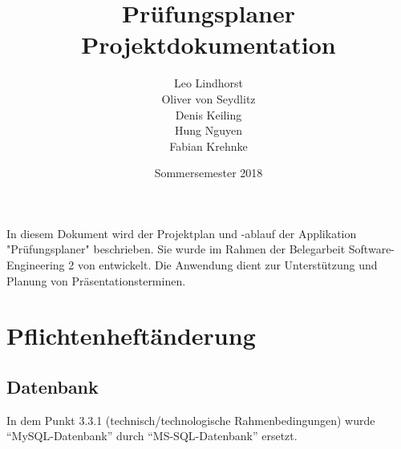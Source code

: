 \documentclass{scrartcl}
\begin{document}
	\title{Prüfungsplaner \\ Projektdokumentation}
	\author{Leo Lindhorst\\
			Oliver von Seydlitz\\
			Denis Keiling\\
			Hung Nguyen\\
			Fabian Krehnke}
	\date{Sommersemester 2018}
	\maketitle
	
	\tableofcontents
	
	In diesem Dokument wird der Projektplan und -ablauf der Applikation "Prüfungsplaner" beschrieben. Sie wurde im Rahmen der Belegarbeit Software-Engineering 2 von entwickelt. Die Anwendung dient zur Unterstützung und Planung von Präsentationsterminen.
	
  
  
  
  
  \section{Pflichtenheftänderung}
  \subsection{Datenbank}
  In dem Punkt 3.3.1 (technisch/technologische Rahmenbedingungen) wurde “MySQL-Datenbank” durch “MS-SQL-Datenbank” ersetzt.
\end{document}
